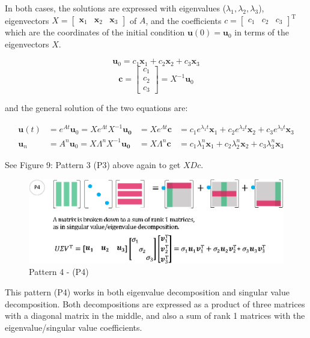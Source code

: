 \documentclass[letterpaper]{article}
\DeclareRobustCommand\transp{^{\mathrm{T}}}
\begin{document}
In both cases, the solutions are expressed with
eigenvalues ($\lambda_1, \lambda_2, \lambda_3$), 
eigenvectors $X=\begin{bmatrix} \bm{x}_1 & \bm{x}_2 & \bm{x}_3 \end{bmatrix}$ of $A$, and
the coefficients $c=\begin{bmatrix} c_1 & c_2 & c_3 \end{bmatrix}\transp$
which are the coordinates of the initial condition $\bm{u}(0)=\bm{u}_0$ in terms of
the eigenvectors $X$.

\begin{equation*}
  \bm{u}_0 = c_1 \bm{x}_1 + c_2 \bm{x}_2 + c_3 \bm{x}_3
\end{equation*}
\begin{equation*}
  \bm{c} =
  \begin{bmatrix}
    c_1\\
    c_2\\
    c_3
  \end{bmatrix} = X^{-1} \bm{u}_0
\end{equation*}

and the general solution of the two equations are:

\begin{align*}
  \bm{u}(t) &= e^{At} \bm{u}_0 = X e^{\Lambda t} X^{-1} \bm{u_0} &= X e^{\Lambda t} \bm{c} &= c_1 e^{\lambda_1 t} \bm{x}_1 + c_2 e^{\lambda_2 t} \bm{x}_2 + c_3 e^{\lambda_3 t} \bm{x}_3\\
  \bm{u}_n &= A^n \bm{u}_0 = X \Lambda^n X^{-1} \bm{u_0} &= X \Lambda^n \bm{c} &= c_1 \lambda_1^n \bm{x}_1 + c_2 \lambda_2^n \bm{x}_2 + c_3 \lambda_3^n \bm{x}_3
\end{align*}

See Figure 9: Pattern 3 (P3) above again to get $XDc$.

\begin{figure}[H]
  \centering
  \includegraphics[scale=0.8]{Pattern4.eps}
  \caption{Pattern 4 - (P4)}
\end{figure}

This pattern (P4) works in both eigenvalue decomposition and singular value decomposition.
Both decompositions are expressed as a product of three matrices with a diagonal matrix in the middle,
and also a sum of rank 1 matrices with the eigenvalue/singular value coefficients.
\end{document}

